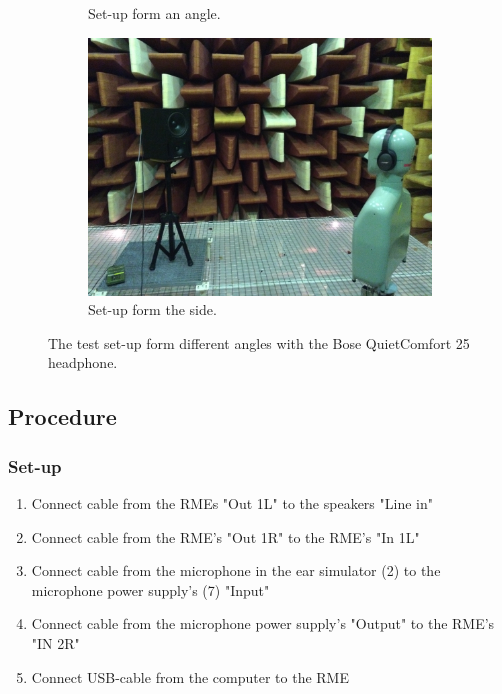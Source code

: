 \begin{figure}[H]
\begin{subfigure}[b]{0.4\textwidth}
		\caption{Set-up form an angle.}
		\vspace{2ex}
		\includegraphics[width=\textwidth]{../Journal/Experiments/TestofConsumerHeadphones/Pictures/OtherBrandsSetupSide.jpg}
		\caption{Set-up form the side.}
	\end{subfigure}
	\caption{The test set-up form different angles with the Bose QuietComfort 25 headphone.}
\label{fig:OtherBrandsPicture}
\end{figure}


\subsection{Procedure}
	\subsubsection{Set-up}
	\begin{enumerate}
		\item Connect cable from the RMEs "Out 1L" to the speakers "Line in"
		\item Connect cable from the RME's "Out 1R" to the RME's "In 1L"
		\item Connect cable from the microphone in the ear simulator (2) to the microphone power supply's (7) "Input"
		\item Connect cable from the microphone power supply's "Output" to the RME's "IN 2R"
		\item Connect USB-cable from the computer to the RME
	\end{enumerate}

